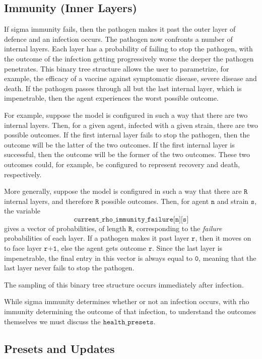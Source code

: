 \documentclass[10pt,letterpaper]{article}
\begin{document}
\subsection{Immunity (Inner Layers)}

If sigma immunity fails, then the pathogen makes it past the outer layer of defence and an infection occurs. The pathogen now confronts a number of internal layers. Each layer has a probability of failing to stop the pathogen, with the outcome of the infection getting progressively worse the deeper the pathogen penetrates. This binary tree structure allows the user to parametrize, for example, the efficacy of a vaccine against symptomatic disease, severe disease and death. If the pathogen passes through all but the last internal layer, which is impenetrable, then the agent experiences the worst possible outcome.

For example, suppose the model is configured in such a way that there are two internal layers. Then, for a given agent, infected with a given strain, there are two possible outcomes. If the first internal layer fails to stop the pathogen, then the outcome will be the latter of the two outcomes. If the first internal layer is successful, then the outcome will be the former of the two outcomes. These two outcomes could, for example, be configured to represent recovery and death, respectively.

More generally, suppose the model is configured in such a way that there are $\texttt{R}$ internal layers, and therefore $\texttt{R}$ possible outcomes. Then, for agent $\texttt{n}$ and strain $\texttt{s}$, the variable $$\texttt{current{\_}rho{\_}immunity{\_}failure[n][s]}$$ gives a vector of probabilities, of length $\texttt{R}$, corresponding to the \textit{failure} probabilities of each layer. If a pathogen makes it past layer $\texttt{r}$, then it moves on to face layer $\texttt{r+1}$, else the agent gets outcome $\texttt{r}$. Since the last layer is impenetrable, the final entry in this vector is always equal to $\texttt{0}$, meaning that the last layer never fails to stop the pathogen.

The sampling of this binary tree structure occurs immediately after infection.

While sigma immunity determines whether or not an infection occurs, with rho immunity determining the outcome of that infection, to understand the outcomes themselves we must discuss the $\texttt{health{\_}presets}$.

\subsection{Presets and Updates}
\end{document}
